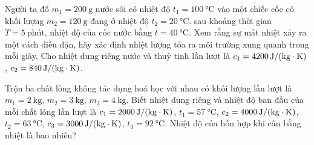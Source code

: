 \begin{ex}
Người ta đổ $m_1 =\SI{200}{\gram}$ nước sôi có nhiệt độ $t_1 =\SI{100}{\celsius}$ vào một chiếc cốc có khối lượng $m_2 = \SI{120}{\gram}$ đang ở nhiệt độ $t_2 =\SI{20}{\celsius}$. sau khoảng thời gian $T = \SI{5}{\text{phút}}$, nhiệt độ của cốc nước bằng $t=\SI{40}{\celsius}$. Xem rằng sự mất nhiệt xảy ra một cách điều đặn, hãy xác định nhiệt lượng tỏa ra môi trường xung quanh trong mỗi giây. Cho nhiệt dung riêng nước và thuỷ tinh lần lượt là $c_1=\SI{4200}{\joule/\left(\kilogram\cdot\kelvin\right)}$, $c_2=\SI{840}{\joule/\left(\kilogram\cdot\kelvin\right)}$.
	
\end{ex}
\begin{ex}
	Trộn ba chất lỏng không tác dụng hoá học với nhau có khối lượng lần lượt là $m_1=\SI{2}{\kilogram}$, $m_2=\SI{3}{\kilogram}$, $m_3=\SI{4}{\kilogram}$. Biết nhiệt dung riêng và nhiệt độ ban đầu của mỗi chất lỏng lần lượt là $c_1=\SI{2000}{\joule/\left(\kilogram\cdot\kelvin\right)}$, $t_1=\SI{57}{\celsius}$, $c_2=\SI{4000}{\joule/\left(\kilogram\cdot\kelvin\right)}$, $t_2=\SI{63}{\celsius}$, $c_3=\SI{3000}{\joule/\left(\kilogram\cdot\kelvin\right)}$, $t_3=\SI{92}{\celsius}$. Nhiệt độ của hỗn hợp khi cân bằng nhiệt là bao nhiêu?
	
\end{ex}
